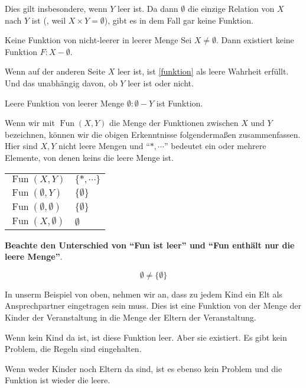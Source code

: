 \documentclass[a4paper]{amsart}
\theoremstyle{definition}
\begin{document}
Dies gilt insbesondere, wenn $Y$ leer ist. Da dann $\emptyset$ die einzige Relation von $X$ nach $Y$ ist (, weil $X \times Y = \emptyset$), gibt es in dem Fall gar keine Funktion.
\begin{Satz}{Keine Funktion von nicht-leerer in leerer Menge}
   Sei $X \ne \emptyset$. Dann existiert keine Funktion $F \colon X - \emptyset$.
\end{Satz}

Wenn auf der anderen Seite $X$ leer ist, ist \eqref{funktion} als leere Wahrheit erfüllt. Und das unabhängig davon, ob $Y$ leer ist oder nicht.
\begin{Satz}{Leere Funktion von leerer Menge}
   $\emptyset \colon \emptyset - Y$ ist Funktion.
\end{Satz}

Wenn wir mit $\operatorname{Fun}(X,Y)$ die Menge der Funktionen zwischen $X$ und $Y$ bezeichnen, können wir die obigen Erkenntnisse folgendermaßen zusammenfassen. Hier sind $X, Y$ nicht leere Mengen und "`$*, \cdots$"' bedeutet ein oder mehrere Elemente, von denen keins die leere Menge ist.

\begin{tabular}{|l|l|}
   \hline
   $\operatorname{Fun}(X,Y)$ & $\{ *, \cdots \}$\\
   $\operatorname{Fun}(\emptyset,Y)$ & $\{\emptyset\}$\\
   $\operatorname{Fun}(\emptyset,\emptyset)$ & $\{\emptyset\}$\\
   $\operatorname{Fun}(X,\emptyset)$ & $\emptyset$\\
   \hline
\end{tabular}

\textbf{Beachte den Unterschied von "`Fun ist leer"' und "`Fun enthält nur die leere Menge"'}.

\begin{equation}
   \boxed{\emptyset \ne \{\emptyset\}}
\end{equation}

In unserm Beispiel von oben, nehmen wir an, dass zu jedem Kind ein Elt als Ansprechpartner eingetragen sein muss. Dies ist eine Funktion von der Menge der Kinder der Veranstaltung in die Menge der Eltern der Veranstaltung.

Wenn kein Kind da ist, ist diese Funktion leer. Aber sie existiert. Es gibt kein Problem, die Regeln sind eingehalten.

Wenn weder Kinder noch Eltern da sind, ist es ebenso kein Problem und die Funktion ist wieder die leere.
\end{document}
